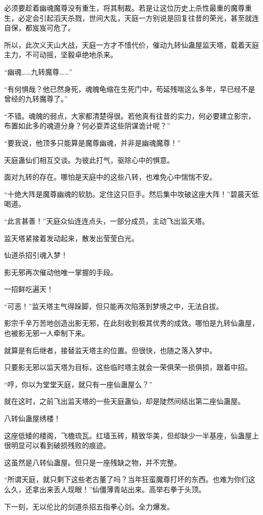 \begin{this_body}
必须要趁着幽魂魔尊没有重生，将其制裁。若是让这位历史上杀性最重的魔尊重生，必定会引起滔天杀戮，世间大乱，天庭一方别说是回复往昔的荣光，甚至就连自保，都岌岌可危了。

所以，此次义天山大战，天庭一方才不惜代价，催动九转仙蛊屋监天塔，载着天庭主力，不可动摇，坚毅卓绝地杀来。

“幽魂……九转魔尊……”

“有何惧哉？他已然身死，魂魄龟缩在生死门中，苟延残喘这么多年，早已经不是曾经的九转魔尊了。”

“不错。魂魄的弱点，大家都清楚得很。若他真有往昔的实力，何必要建立影宗，布置如此多的魂道分身？何必耍弄这些阴谋诡计呢？”

“要我说，他顶多只能算是魔尊幽魂，并非是幽魂魔尊！”

天庭蛊仙们相互交谈。为彼此打气，驱除心中的惧意。

面对九转的存在。哪怕是天庭中的这些八转，也难免心中惴惴不安。

“十绝大阵是魔尊幽魂的软肋。定住这只巨手。然后集中攻破这座大阵！”碧晨天低喝道。

“此言甚善！”天庭众仙连连点头，一部分成员，主动飞出监天塔。

监天塔紧接着发动起来，散发出莹莹白光。

仙道杀招引魂入梦！

影无邪再次催动他唯一掌握的手段。

一招鲜吃遍天！

“可恶！”监天塔主气得跺脚，但只能再次陷落到梦境之中，无法自拔。

影宗千辛万苦地创造出影无邪，在此刻收到极其优秀的成效。哪怕是九转仙蛊屋，也被影无邪一人牵制下来。

就算是有后继者，接替监天塔主的位置。但很快，也随之落入梦中。

只要影无邪以监天塔为目标，这些临时塔主就会一荣俱荣一损俱损，跟着中招。

“哼，你以为堂堂天庭，就只有一座仙蛊屋么？”

就在这时，之前飞出监天塔的一些天庭蛊仙，却是陡然间结出第二座仙蛊屋。

八转仙蛊屋绣楼！

这座低矮的楼阁，飞檐琉瓦。红墙玉砖，精致华美，但却缺少一半基座，仙蛊屋上很明显可以看到破损残败的痕迹。

这虽然是八转仙蛊屋。但只是一座残缺之物，并不完整。

“所谓天庭，就只剩下这些老古董了吗？当年狂蛮魔尊打坏的东西。也难为你们这么久，还拿出来丢人现眼！”仙僵薄青站出来。高举右拳于头顶。

下一刻，无以伦比的剑道杀招五指拳心剑。全力爆发。


\end{this_body}

